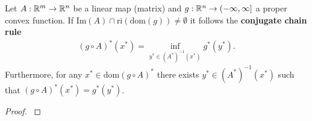 \begin{theorem}
  \label{cvxa_conjugate_chain_rule}
  Let 
  $
    A:
      \mathbb{R}^m \to \mathbb{R}^n
  $
  be a linear map (matrix)
  and
  $
    g:
      \mathbb{R}^n \to (-\infty, \infty]
  $
  a proper convex function. If
  $
    \text{Im}(A) \cap \text{ri}(\text{dom}(g))
    \neq
    \emptyset
  $
  it follows
  the 
  \textbf{conjugate chain rule}
  \begin{gather}
    ( g \circ A )^* ( x^* )
    =
    \inf_
          { y^* \in ( A^* )^{ -1 } ( x^* )}
                                          g^*( y^* )
                                          .
  \end{gather}
  Furthermore, 
    for any 
      $
        x^* \in \text{dom}( g \circ A)^*
      $
        there exists
          $
            y^* \in ( A^* )^{ -1 } ( x^* )
          $
            such that
              $
                ( g \circ A)^* ( x^* )
                =
                g^*( y^* )
              $.
\end{theorem}
\begin{proof}
  \cite[Theorem~4.28(c)]{Mordukhovich2022}
\end{proof}
